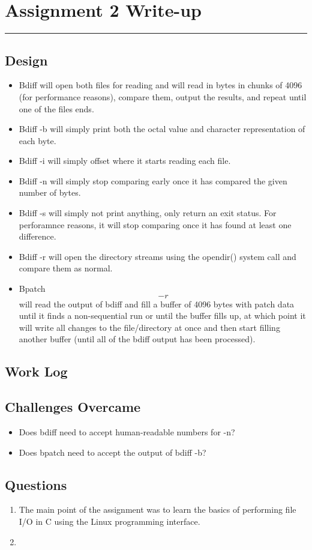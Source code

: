 \documentclass[letterpaper,10pt,fleqn]{article}
\numberwithin{equation}{section}
\begin{document}

\section*{Assignment 2 Write-up}
\hrule

\subsection*{Design}
\begin{itemize}
    \item Bdiff will open both files for reading and will read in bytes in chunks of 4096 (for performance reasons), compare them, output the results, and repeat until one of the files ends.
    \item Bdiff -b will simply print both the octal value and character representation of each byte.
    \item Bdiff -i will simply offset where it starts reading each file.
    \item Bdiff -n will simply stop comparing early once it has compared the given number of bytes.
    \item Bdiff -s will simply not print anything, only return an exit status.  For perforamnce reasons, it will stop comparing once it has found at least one difference.
    \item Bdiff -r will open the directory streams using the opendir() system call and compare them as normal.
    \item Bpatch \[-r\] will read the output of bdiff and fill a buffer of 4096 bytes with patch data until it finds a non-sequential run or until the buffer fills up, at which point it will write all changes to the file/directory at once and then start filling another buffer (until all of the bdiff output has been processed).
\end{itemize}

\subsection*{Work Log}

\subsection*{Challenges Overcame}
\begin{itemize}
    \item Does bdiff need to accept human-readable numbers for -n?
    \item Does bpatch need to accept the output of bdiff -b?
\end{itemize}

\subsection*{Questions}
\begin{enumerate}
    \item The main point of the assignment was to learn the basics of performing file I/O in C using the Linux programming interface.
    \item 
\end{enumerate}
\end{document}
